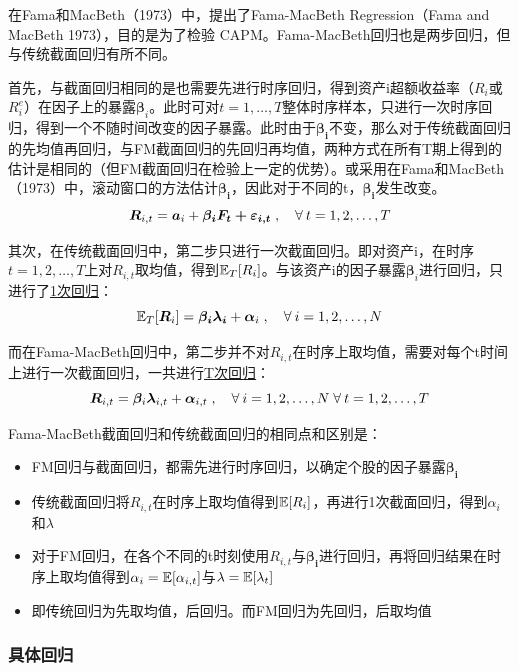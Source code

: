 \documentclass[11pt]{article}
\begin{document}
在Fama和MacBeth（1973）中，提出了Fama-MacBeth Regression（Fama and MacBeth 1973），目的是为了检验 CAPM。Fama-MacBeth回归也是两步回归，但与传统截面回归有所不同。

首先，与截面回归相同的是也需要先进行时序回归，得到资产i超额收益率（$R_i$或$R_i^e$）在因子上的暴露$\bm{\beta}_i$。此时可对$t=1,\dots,T$整体时序样本，只进行一次时序回归，得到一个不随时间改变的因子暴露。此时由于$\bm{\beta_i}$不变，那么对于传统截面回归的先均值再回归，与FM截面回归的先回归再均值，两种方式在所有T期上得到的估计是相同的（但FM截面回归在检验上一定的优势）。或采用在Fama和MacBeth（1973）中，滚动窗口的方法估计$\bm{\beta_i}$，因此对于不同的t，$\bm{\beta_i}$发生改变。
\begin{equation*}
    \bm{R}_{i,t} = \bm{a}_i + \bm{\beta_{i} \bm{F}_t + \bm{\varepsilon}_{i,t}} \inlinesep \forall t=1,2,\dots,T
\end{equation*}

其次，在传统截面回归中，第二步只进行一次截面回归。即对资产i，在时序$t=1,2,\dots,T$上对$R_{i,t}$取均值，得到$\mathbb{E}_T[R_i]$。与该资产i的因子暴露$\bm{\beta}_i$进行回归，只进行了\uline{1次回归}：
\begin{equation*}
    \E_T[\bm{R}_i] = \bm{\beta_{i} \lambda_i} + \bm{\alpha}_i \inlinesep \forall i=1,2,\dots,N
\end{equation*}

而在Fama-MacBeth回归中，第二步并不对$R_{i,t}$在时序上取均值，需要对每个t时间上进行一次截面回归，一共进行\uline{T次回归}：
\begin{equation*}
    \bm{R}_{i,t} = \bm{\beta}_{i} \bm{\lambda}_{i,t} + \bm{\alpha}_{i,t} \inlinesep \forall i=1,2,\dots,N  \;\forall t=1,2,\dots,T
\end{equation*}

Fama-MacBeth截面回归和传统截面回归的相同点和区别是：
\begin{itemize}
    \item FM回归与截面回归，都需先进行时序回归，以确定个股的因子暴露$\bm{\beta_i}$
    \item 传统截面回归将$R_{i,t}$在时序上取均值得到$\mathbb{E}[R_i]$，再进行1次截面回归，得到$\alpha_i$和$\lambda$
    \item 对于FM回归，在各个不同的t时刻使用$R_{i,t}$与$\bm{\beta_{i}}$进行回归，再将回归结果在时序上取均值得到$\alpha_i = \mathbb{E}[\alpha_{i,t}]$与$\lambda=\mathbb{E}[\lambda_t]$
    \item 即传统回归为先取均值，后回归。而FM回归为先回归，后取均值
\end{itemize}

\subsubsection{具体回归}
\end{document}

